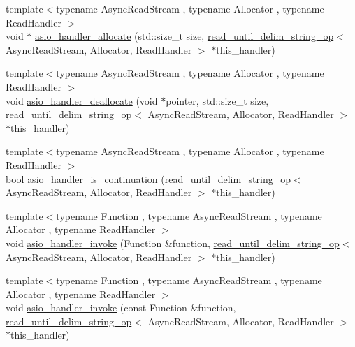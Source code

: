 \begin{DoxyCompactItemize}
\item 
{\footnotesize template$<$typename Async\+Read\+Stream , typename Allocator , typename Read\+Handler $>$ }\\void $\ast$ \hyperlink{namespaceasio_1_1detail_a77ea341653cc967f50d1365f78a58a1e}{asio\+\_\+handler\+\_\+allocate} (std\+::size\+\_\+t size, \hyperlink{classasio_1_1detail_1_1read__until__delim__string__op}{read\+\_\+until\+\_\+delim\+\_\+string\+\_\+op}$<$ Async\+Read\+Stream, Allocator, Read\+Handler $>$ $\ast$this\+\_\+handler)
\item 
{\footnotesize template$<$typename Async\+Read\+Stream , typename Allocator , typename Read\+Handler $>$ }\\void \hyperlink{namespaceasio_1_1detail_a1a886064371f53e4601644a42eff0cef}{asio\+\_\+handler\+\_\+deallocate} (void $\ast$pointer, std\+::size\+\_\+t size, \hyperlink{classasio_1_1detail_1_1read__until__delim__string__op}{read\+\_\+until\+\_\+delim\+\_\+string\+\_\+op}$<$ Async\+Read\+Stream, Allocator, Read\+Handler $>$ $\ast$this\+\_\+handler)
\item 
{\footnotesize template$<$typename Async\+Read\+Stream , typename Allocator , typename Read\+Handler $>$ }\\bool \hyperlink{namespaceasio_1_1detail_a8a1a4636b5428433883eebc7d74f7064}{asio\+\_\+handler\+\_\+is\+\_\+continuation} (\hyperlink{classasio_1_1detail_1_1read__until__delim__string__op}{read\+\_\+until\+\_\+delim\+\_\+string\+\_\+op}$<$ Async\+Read\+Stream, Allocator, Read\+Handler $>$ $\ast$this\+\_\+handler)
\item 
{\footnotesize template$<$typename Function , typename Async\+Read\+Stream , typename Allocator , typename Read\+Handler $>$ }\\void \hyperlink{namespaceasio_1_1detail_a02cdc7aea3760c6ec5484bffdaa39c92}{asio\+\_\+handler\+\_\+invoke} (Function \&function, \hyperlink{classasio_1_1detail_1_1read__until__delim__string__op}{read\+\_\+until\+\_\+delim\+\_\+string\+\_\+op}$<$ Async\+Read\+Stream, Allocator, Read\+Handler $>$ $\ast$this\+\_\+handler)
\item 
{\footnotesize template$<$typename Function , typename Async\+Read\+Stream , typename Allocator , typename Read\+Handler $>$ }\\void \hyperlink{namespaceasio_1_1detail_ac107cb06fdcb80868ea54b1c6326269b}{asio\+\_\+handler\+\_\+invoke} (const Function \&function, \hyperlink{classasio_1_1detail_1_1read__until__delim__string__op}{read\+\_\+until\+\_\+delim\+\_\+string\+\_\+op}$<$ Async\+Read\+Stream, Allocator, Read\+Handler $>$ $\ast$this\+\_\+handler)

\end{DoxyCompactItemize}
